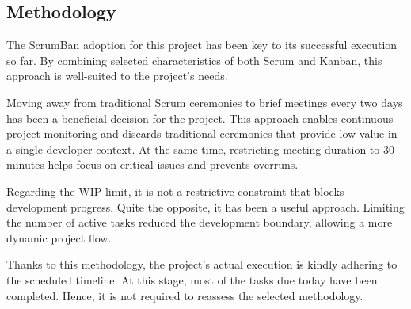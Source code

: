 \subsection{Methodology}

The ScrumBan adoption for this project has been key to its successful execution so far. By combining selected characteristics of both Scrum and Kanban, this approach is well-suited to the project's needs.

Moving away from traditional Scrum ceremonies to brief meetings every two days has been a beneficial decision for the project. This approach enables continuous project monitoring and discards traditional ceremonies that provide low-value in a single-developer context. At the same time, restricting meeting duration to 30 minutes helps focus on critical issues and prevents overruns.

Regarding the WIP limit, it is not a restrictive constraint that blocks development progress. Quite the opposite, it has been a useful approach. Limiting the number of active tasks reduced the development boundary, allowing a more dynamic project flow.

Thanks to this methodology, the project's actual execution is kindly adhering to the scheduled timeline. At this stage, most of the tasks due today have been completed. Hence, it is not required to reassess the selected methodology.
